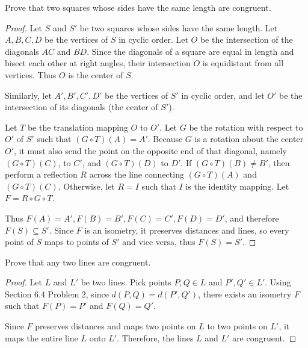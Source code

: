 \begin{tcolorbox}[title=Problem 3, breakable]
    Prove that two squares whose sides have the 
        same length are congruent.
\end{tcolorbox}

\begin{proof}
    Let $S$ and $S'$ be two squares whose sides have the same length.
    Let $A, B, C, D$ be the vertices of $S$ in cyclic order.
    Let $O$ be the intersection of the diagonals $AC$ and $BD$.
    Since the diagonals of a square are equal in length and bisect each other
        at right angles, their intersection $O$ is equidistant from all vertices.
    Thus $O$ is the center of $S$.

    Similarly, let $A', B', C', D'$ be the vertices of $S'$ in cyclic order,
    and let $O'$ be the intersection of its diagonals (the center of $S'$).

    Let $T$ be the translation mapping $O$ to $O'$.
    Let $G$ be the rotation with respect to $O'$
        of $S'$ such that $(G \circ T)(A) = A'$.
    Because $G$ is a rotation about the center $O'$, it must also send 
        the point on the opposite end of that diagonal, namely $(G\circ T)(C)$, to $C'$, 
        and $(G\circ T)(D)$ to $D'$.
    If $(G \circ T)(B) \neq B'$, then perform  
        a reflection $R$ across the line connecting $(G \circ T)(A)$ and $(G \circ T)(C)$.
    Otherwise, let $R = I$ such that $I$ is the identity mapping.
    Let $F = R \circ G \circ T$.

    Thus $F(A) = A', F(B) = B', F(C) = C', F(D) = D'$, 
        and therefore $F(S) \subseteq S'$.
    Since $F$ is an isometry, it preserves distances and lines, so 
    every point of $S$ maps to points of $S'$ and vice versa, thus $F(S) = S'$.
\end{proof}

\newpage
\begin{tcolorbox}[title=Problem 4, breakable]
    Prove that any two lines are congruent.
\end{tcolorbox}


\begin{proof}
    Let $L$ and $L'$ be two lines. Pick points $P, Q \in L$ and $P', Q' \in L'$.  
    Using Section $6.4$ Problem $2$, since $d(P,Q) = d(P',Q')$, there exists an isometry $F$ such that $F(P) = P'$ and $F(Q) = Q'$.  

    Since $F$ preserves distances and maps two points on $L$ to two points on $L'$, it maps the entire line $L$ onto $L'$.  
    Therefore, the lines $L$ and $L'$ are congruent.
\end{proof}

